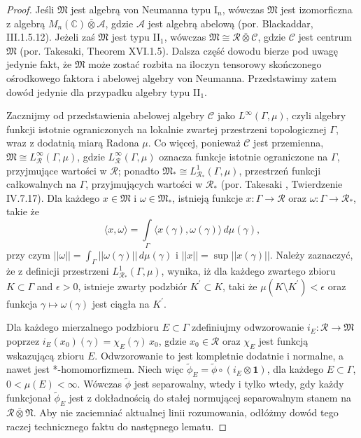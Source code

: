 \begin{proof}
Jeśli $\mathfrak{M}$ jest algebrą von Neumanna typu I$\phantom{}_{n}$,
wówczas $\mathfrak{M}$ jest izomorficzna z algebrą
$M_{n}(\mathbb{C}) \bar{\otimes} \mathcal{A}$,
gdzie $\mathcal{A}$ jest algebrą abelową
(por. Blackaddar\cite{Blackadar2006}, III.1.5.12).
Jeżeli zaś $\mathfrak{M}$ jest typu II$\phantom{}_{1}$,
wówczas $\mathfrak{M} \cong  \mathcal{R}\bar{\otimes}\mathcal{C}$,
gdzie $\mathcal{C}$ jest centrum $\mathfrak{M}$
(por. Takesaki\cite{Takesaki3}, Theorem XVI.1.5).
Dalsza część dowodu bierze pod uwagę jedynie fakt, że $\mathfrak{M}$
może zostać rozbita na iloczyn tensorowy skończonego ośrodkowego faktora i
abelowej algebry von Neumanna.
Przedstawimy zatem dowód jedynie dla przypadku algebry typu II$\phantom{}_{1}$.

Zacznijmy od przedstawienia abelowej algebry $\mathcal{C}$ jako
$L^{\infty}(\Gamma, \mu)$, czyli algebry funkcji istotnie ograniczonych
na lokalnie zwartej przestrzeni topologicznej $\Gamma$,
wraz z dodatnią miarą Radona $\mu$.
Co więcej, ponieważ $\mathcal{C}$ jest przemienna,
$\mathfrak{M} \cong L^{\infty}_{\mathcal{R}}(\Gamma, \mu)$,
gdzie $L^{\infty}_{\mathcal{R}}(\Gamma, \mu)$  oznacza
funkcje istotnie ograniczone na $\Gamma$, przyjmujące wartości w $\mathcal{R}$;
ponadto $\mathfrak{M}_{*} \cong L^{1}_{\mathcal{R}_{*}}(\Gamma, \mu)$,
przestrzeń funkcji całkowalnych na $\Gamma$, przyjmujących wartości w $\mathcal{R}_{*}$
(por. Takesaki \cite{Takesaki1}, Twierdzenie IV.7.17).
Dla każdego $x \in \mathfrak{M}$ i $\omega \in \mathfrak{M}_{*}$,
istnieją funkcje $x:\Gamma\to\mathcal{R}$ oraz
$\omega:\Gamma\to\mathcal{R}_{*}$, takie że
\begin{equation}
\langle x, \omega \rangle =\int \limits_{\Gamma}
\langle x(\gamma), \omega(\gamma) \rangle \, d \mu(\gamma),
\end{equation}
przy czym $||\omega|| = \int_{\Gamma} ||\omega(\gamma)|| \, d \mu(\gamma)$
i $||x|| = \sup || x(\gamma) ||$.
Należy zaznaczyć, że z definicji przestrzeni $L^{1}_{\mathcal{R}_{*}}(\Gamma, \mu)$,
wynika, iż dla każdego zwartego zbioru
$K \subset \Gamma$ and $\epsilon >0$,
istnieje zwarty podzbiór $K^{'} \subset K$,
taki że $\mu (K \setminus K^{'}) < \epsilon$
oraz funkcja $\gamma \mapsto \omega(\gamma)$ jest ciągła na $K^{'}$.

Dla każdego mierzalnego podzbioru $E \subset \Gamma$
zdefiniujmy odwzorowanie
$i_{E}: \mathcal{R} \rightarrow \mathfrak{M}$ poprzez
$i_{E}(x_{0})(\gamma) = \chi_{E}(\gamma) \, x_{0}$,
gdzie $x_{0} \in \mathcal{R}$
oraz $\chi_{E}$ jest funkcją wskazującą zbioru $E$.
Odwzorowanie to jest kompletnie dodatnie i normalne,
a nawet jest *-homomorfizmem.
Niech więc $\tilde{\phi}_{E} = \tilde{\phi} \circ (i_{E} \otimes \mathbf{1})$,
dla każdego $E \subset \Gamma$, $0<\mu(E)<\infty$.
Wówczas $\tilde{\phi}$ jest separowalny, wtedy i tylko wtedy, gdy
każdy funkcjonał $\tilde{\phi}_{E}$ jest z dokładnością do stałej
normującej separowalnym stanem na $\mathcal{R} \bar{\otimes} \mathfrak{N}$.
Aby nie zaciemniać aktualnej linii rozumowania,
odłóżmy dowód tego raczej technicznego faktu do następnego lematu.


\end{proof}
